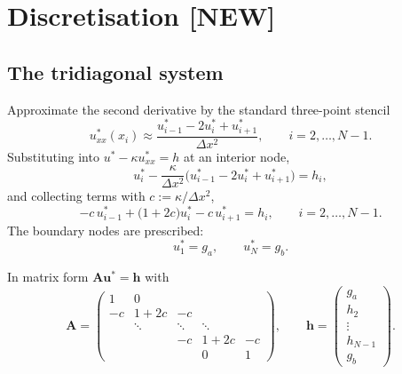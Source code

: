 \documentclass[11pt,a4paper]{article}
\theoremstyle{remark}
\newcommand{\us}{u^{*}}
\begin{document}
\section{Discretisation \textbf{[NEW]}}

\subsection{The tridiagonal system}

Approximate the second derivative by the standard three-point stencil
\begin{equation}
\us_{xx}(x_i) \approx \frac{\us_{i-1} - 2\us_i + \us_{i+1}}{\Delta x^2},
\qquad i = 2,\dots,N-1 .
\end{equation}
Substituting into $\us - \kappa\us_{xx} = h$ at an interior node,
\begin{equation}
\us_i - \frac{\kappa}{\Delta x^2}\Big(\us_{i-1} - 2\us_i + \us_{i+1}\Big) = h_i,
\end{equation}
and collecting terms with $c := \kappa/\Delta x^2$,
\begin{equation}
-c\,\us_{i-1} + \big(1+2c\big)\us_i - c\,\us_{i+1} = h_i,
\qquad i = 2,\dots,N-1 .
\label{eq:interior-row}
\end{equation}
The boundary nodes are prescribed:
\begin{equation}
\us_1 = g_a, \qquad \us_N = g_b .
\label{eq:boundary-row}
\end{equation}

In matrix form $\bm{A}\bm{\us} = \bm{h}$ with
\begin{equation}
\bm{A} =
\begin{pmatrix}
1 & 0 & & & \\
-c & 1+2c & -c & & \\
 & \ddots & \ddots & \ddots & \\
 & & -c & 1+2c & -c \\
 & & & 0 & 1
\end{pmatrix},
\qquad
\bm{h} =
\begin{pmatrix}
g_a \\ h_2 \\ \vdots \\ h_{N-1} \\ g_b
\end{pmatrix}.
\label{eq:matrixA}
\end{equation}
\end{document}

